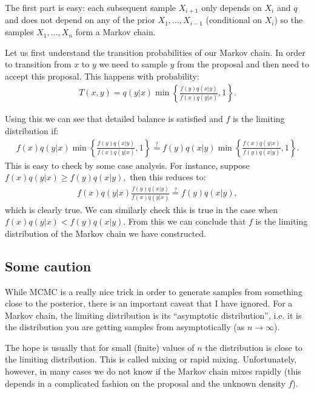 \documentclass[twoside,12pt]{article}
\begin{document}
The first part is easy: each subsequent sample $X_{i+1}$ only depends on $X_i$ and $q$ and does not depend on any of the prior $X_1,\ldots,X_{i-1}$ (conditional on $X_i$) so the samples $X_1,\ldots,X_n$ form a Markov chain.

Let us first understand the transition probabilities of our Markov chain. In order to transition from $x$ to $y$ we need to sample $y$ from the proposal and then need to accept this proposal. This happens with probability:
\begin{align*}
T(x,y) = q(y | x) \min \left\{ \frac{f(y) q(x | y) } {f(x) q(y | x) }, 1 \right\}.
\end{align*}

Using this we can see that detailed balance is satisfied and $f$ is the limiting distribution if:
\begin{align*}
f(x) q(y | x) \min \left\{ \frac{f(y) q(x | y) } {f(x) q(y | x) }, 1 \right\} \stackrel{?}{=}
f(y) q(x | y) \min \left\{ \frac{f(x) q(y | x) } {f(y) q(x | y) }, 1 \right\}.
\end{align*}
This is easy to check by some case analysis. For instance, suppose $f(x) q(y | x) \geq f(y) q(x | y),$
then this reduces to:
\begin{align*}
f(x) q(y | x) \frac{f(y) q(x | y) } {f(x) q(y | x) }  \stackrel{?}{=} f(y) q(x | y),
\end{align*}
which is clearly true. We can similarly check this is true in the case when $f(x) q(y | x) < f(y) q(x | y).$ From this we can conclude that $f$ is the limiting distribution of the Markov chain we have constructed. 

\subsection{Some caution}
While MCMC is a really nice trick in order to generate samples from something close to the posterior, there is an important caveat that I have ignored. For a Markov chain, the limiting distribution is its ``asymptotic distribution'', i.e. it is the distribution you are getting samples from asymptotically (as $n \rightarrow \infty$).

The hope is usually that for small (finite) values of $n$ the distribution is close to the limiting distribution. This is called mixing or rapid mixing. 
Unfortunately, however, in many cases we do not know if the Markov chain mixes rapidly (this depends in a complicated fashion on the proposal and the unknown density $f$). 
\end{document}
